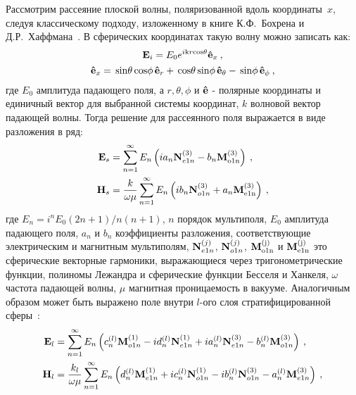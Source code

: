 Рассмотрим рассеяние плоской волны, поляризованной вдоль
координаты~$x$, следуя классическому подходу, изложенному в книге
К.Ф.~Бохрена и Д.Р.~Хаффмана~\cite{Bohren-1983}.  В сферических
координатах такую волну можно записать как:
\begin{equation*}
  \label{eq:bh4.21}
  {\rm \mathbf{E}}_i = E_0 e^{i{\rm k}r{\rm cos}\theta}
  {\boldsymbol{\hat{\rm e}}}_{x}\:,
\end{equation*}
\begin{equation*}
{\boldsymbol{\hat{\rm e}}}_{x} = \,{\rm sin}\theta\, {\rm cos} \phi\, 
{\boldsymbol{\hat{\rm e}}}_{r} 
+\, {\rm cos}\theta\, {\rm sin} \phi\, {\boldsymbol{\hat{\rm e}}}_{\theta}
-\, {\rm sin} \phi\, {\boldsymbol{\hat{\rm e}}}_{\phi}\:,
\end{equation*}
где $E_0$ амплитуда падающего поля, а $r,\theta,\phi$ и
${\boldsymbol{\hat{\rm e}}}$ - полярные координаты и единичный вектор для
выбранной системы координат, $k$ волновой вектор падающей волны.
Тогда решение для рассеянного поля выражается в виде разложения в ряд:
\begin{align*}
{\rm \mathbf{E}}_s &=\sum_{n=1}^{\infty} E_n \left( i a_n {\rm
    \mathbf{N}}_{e1n}^{(3)} - b_n{\rm\mathbf{M}_{o1n}^{(3)}} \right)\:,\\
{\rm \mathbf{H}}_s &=\frac{k}{\omega\mu}
 \sum_{n=1}^{\infty} E_n \left( i b_n {\rm
    \mathbf{N}}_{o1n}^{(3)} + a_n{\rm\mathbf{M}_{e1n}^{(3)}} \right)\:,  
\end{align*}
где $E_n=i^nE_0(2n+1)/n(n+1)$, $n$ порядок мультиполя, $E_0$ амплитуда
падающего поля, $a_n$ и $b_n$ коэффициенты разложения, соответствующие
электрическим и магнитным мультиполям, ${\rm \mathbf{N}}_{e1n}^{(j)}$,
${\rm \mathbf{N}}_{o1n}^{(j)}$, ${\rm\mathbf{M}_{o1n}^{(j)}}$ и
${\rm\mathbf{M}_{e1n}^{(j)}}$ это сферические векторные гармоники,
выражающиеся через тригонометрические функции, полиномы Лежандра и
сферические функции Бесселя и Ханкеля, $\omega$ частота падающей
волны, $\mu$ магнитная проницаемость в вакууме.  Аналогичным образом
может быть выражено поле внутри $l$-ого слоя стратифицированной
сферы~\cite{Yang-2003}:
\begin{align}
{\rm \mathbf{E}}_l &=\sum_{n=1}^{\infty} E_n \left(
                     c_n^{(l)}{\rm\mathbf{M}}_{o1n}^{(1)}
                     -i d_n^{(l)} {\rm \mathbf{N}}_{e1n}^{(1)}
                     +i a_n^{(l)} {\rm \mathbf{N}}_{e1n}^{(3)}
                     - b_n^{(l)}{\rm\mathbf{M}}_{o1n}^{(3)} 
                     \right)\label{eq:3p1}\:,\\
{\rm \mathbf{H}}_l &=\frac{k_l}{\omega\mu} \sum_{n=1}^{\infty} E_n
                     \left(
                      d_n^{(l)}{\rm\mathbf{M}}_{e1n}^{(1)} 
                     +i c_n^{(l)} {\rm \mathbf{N}}_{o1n}^{(1)} 
                     -i b_n^{(l)} {\rm \mathbf{N}}_{o1n}^{(3)} 
                     - a_n^{(l)}{\rm\mathbf{M}}_{e1n}^{(3)} 
                     \right)\:,\label{eq:3p2}  
\end{align}
